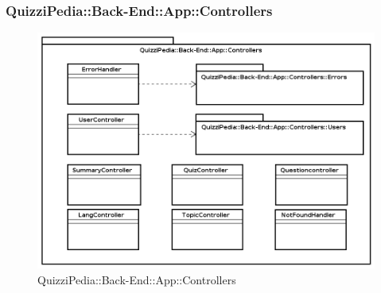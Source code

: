 \newpage
\subsubsection{QuizziPedia::Back-End::App::Controllers}

\label{QuizziPedia::Back-End::App::Controllers}
\begin{figure}[ht]
	\centering
	\includegraphics[scale=0.5]{UML/Package/QuizziPedia_Back-End_App_Controllers.png}
	\caption{QuizziPedia::Back-End::App::Controllers}
\end{figure}
\FloatBarrier
